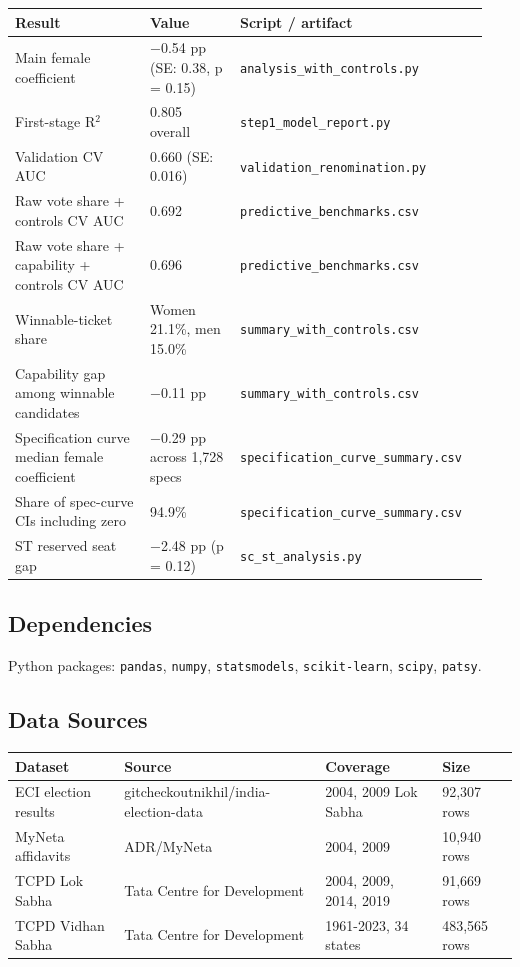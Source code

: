 \documentclass[
]{article}
\newcounter{none} %
\begin{document}
{\def\LTcaptype{none} %
\begin{longtable}[]{@{}p{0.27\linewidth}p{0.18\linewidth}p{0.49\linewidth}@{}}
\toprule\noalign{}
Result & Value & Script / artifact \\
\midrule\noalign{}
\endhead
\bottomrule\noalign{}
\endlastfoot
Main female coefficient & $-$0.54 pp (SE: 0.38, p = 0.15) & \texttt{analysis\_with\_controls.py} \\
First-stage R$^2$ & 0.805 overall & \texttt{step1\_model\_report.py} \\
Validation CV AUC & 0.660 (SE: 0.016) & \texttt{validation\_renomination.py} \\
Raw vote share + controls CV AUC & 0.692 & \texttt{predictive\_benchmarks.csv} \\
Raw vote share + capability + controls CV AUC & 0.696 & \texttt{predictive\_benchmarks.csv} \\
Winnable-ticket share & Women 21.1\%, men 15.0\% & \texttt{summary\_with\_controls.csv} \\
Capability gap among winnable candidates & $-$0.11 pp & \texttt{summary\_with\_controls.csv} \\
Specification curve median female coefficient & $-$0.29 pp across 1,728 specs & \texttt{specification\_curve\_summary.csv} \\
Share of spec-curve CIs including zero & 94.9\% & \texttt{specification\_curve\_summary.csv} \\
ST reserved seat gap & $-$2.48 pp (p = 0.12) & \texttt{sc\_st\_analysis.py} \\
\end{longtable}
}

\subsection{Dependencies}\label{dependencies}

Python packages: \texttt{pandas}, \texttt{numpy}, \texttt{statsmodels}, \texttt{scikit-learn}, \texttt{scipy}, \texttt{patsy}.

\subsection{Data Sources}\label{data-sources}

{\def\LTcaptype{none} %
\begin{longtable}[]{@{}llll@{}}
\toprule\noalign{}
Dataset & Source & Coverage & Size \\
\midrule\noalign{}
\endhead
\bottomrule\noalign{}
\endlastfoot
ECI election results & gitcheckoutnikhil/india-election-data & 2004, 2009 Lok Sabha & 92,307 rows \\
MyNeta affidavits & ADR/MyNeta & 2004, 2009 & 10,940 rows \\
TCPD Lok Sabha & Tata Centre for Development & 2004, 2009, 2014, 2019 & 91,669 rows \\
TCPD Vidhan Sabha & Tata Centre for Development & 1961-2023, 34 states & 483,565 rows \\
\end{longtable}
}
\end{document}
